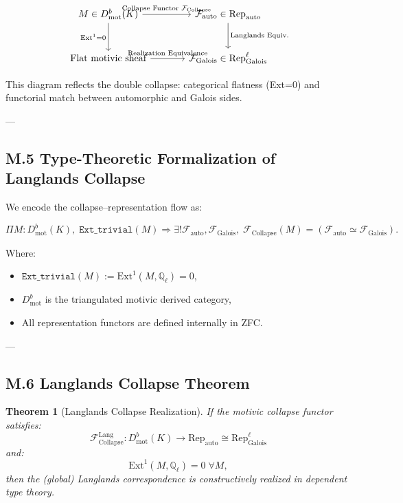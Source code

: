 \documentclass[11pt]{article}
\newtheorem{theorem}{Theorem}[section]
\begin{document}
\[
\begin{tikzcd}[row sep=large, column sep=large]
M \in D^b_{\mathrm{mot}}(K) \arrow[r, "\text{Collapse Functor } \mathcal{F}_{\mathrm{Collapse}}"] \arrow[d, swap, "\mathrm{Ext}^1 = 0"]
& \mathcal{F}_{\mathrm{auto}} \in \mathrm{Rep}_{\mathrm{auto}} \arrow[d, "\text{Langlands Equiv.}"] \\
\text{Flat motivic sheaf} \arrow[r, "\text{Realization Equivalence}"]
& \mathcal{F}_{\mathrm{Galois}} \in \mathrm{Rep}_\mathrm{Galois}^\ell
\end{tikzcd}
\]

This diagram reflects the double collapse: categorical flatness (Ext=0) and functorial match between automorphic and Galois sides.

---

\subsection*{M.5 Type-Theoretic Formalization of Langlands Collapse}

We encode the collapse–representation flow as:

\[
\Pi M : D^b_{\mathrm{mot}}(K),\;
\texttt{Ext\_trivial}(M) \Rightarrow
\exists! \mathcal{F}_{\mathrm{auto}}, \mathcal{F}_{\mathrm{Galois}},\;
\mathcal{F}_{\mathrm{Collapse}}(M) = (\mathcal{F}_{\mathrm{auto}} \simeq \mathcal{F}_{\mathrm{Galois}}).
\]

Where:
\begin{itemize}
  \item $\texttt{Ext\_trivial}(M) := \mathrm{Ext}^1(M, \mathbb{Q}_\ell) = 0$,
  \item $D^b_{\mathrm{mot}}$ is the triangulated motivic derived category,
  \item All representation functors are defined internally in ZFC.
\end{itemize}

---

\subsection*{M.6 Langlands Collapse Theorem}

\begin{theorem}[Langlands Collapse Realization]
If the motivic collapse functor satisfies:
\[
\mathcal{F}_{\mathrm{Collapse}}^{\mathrm{Lang}} : D^b_{\mathrm{mot}}(K) \to \mathrm{Rep}_{\mathrm{auto}} \cong \mathrm{Rep}_\mathrm{Galois}^\ell
\]
and:
\[
\mathrm{Ext}^1(M, \mathbb{Q}_\ell) = 0 \; \forall M,
\]
then the (global) Langlands correspondence is constructively realized in dependent type theory.
\end{theorem}
\end{document}
